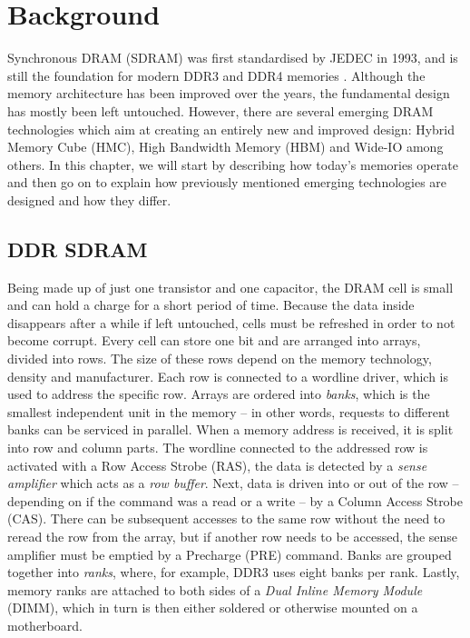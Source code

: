 \chapter{Background} \label{background}
Synchronous DRAM (SDRAM) was first standardised by JEDEC in 1993, and is still the foundation for modern DDR3 and DDR4 memories \cite{standard2008double}. Although the memory architecture has been improved over the years, the fundamental design has mostly been left untouched. However, there are several emerging DRAM technologies which aim at creating an entirely new and improved design: Hybrid Memory Cube (HMC), High Bandwidth Memory (HBM) and Wide-IO among others. In this chapter, we will start by describing how today's memories operate and then go on to explain how previously mentioned emerging technologies are designed and how they differ. 

\section{DDR SDRAM}
Being made up of just one transistor and one capacitor, the DRAM cell is small and can hold a charge for a short period of time. Because the data inside disappears after a while if left untouched, cells must be refreshed in order to not become corrupt. Every cell can store one bit and are arranged into arrays, divided into rows. The size of these rows depend on the memory technology, density and manufacturer. Each row is connected to a wordline driver, which is used to address the specific row. Arrays are ordered into \emph{banks}, which is the smallest independent unit in the memory -- in other words, requests to different banks can be serviced in parallel. When a memory address is received, it is split into row and column parts. The wordline connected to the addressed row is activated with a Row Access Strobe (RAS), the data is detected by a \emph{sense amplifier} which acts as a \emph{row buffer}. Next, data is driven into or out of the row -- depending on if the command was a read or a write -- by a Column Access Strobe (CAS). There can be subsequent accesses to the same row without the need to reread the row from the array, but if another row needs to be accessed, the sense amplifier must be emptied by a Precharge (PRE) command. Banks are grouped together into \emph{ranks}, where, for example, DDR3 uses eight banks per rank. Lastly, memory ranks are attached to both sides of a \emph{Dual Inline Memory Module} (DIMM), which in turn is then either soldered or otherwise mounted on a motherboard. 
\bigskip

